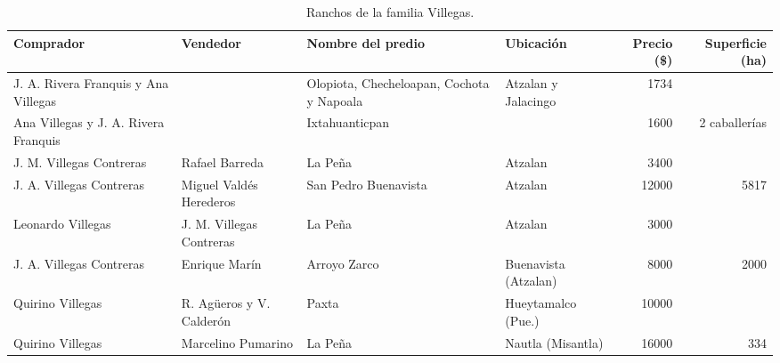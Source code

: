 \documentclass[14pt,twoside,final]{extbook} %
\begin{document}
\begin{sidewaystable}
\scriptsize
\centering
\caption[Ranchos de la familia Villegas]{Ranchos de la familia Villegas.}
\tlfstyle
\begin{tabular}{@{}llllrr@{}}
\toprule
Comprador & Vendedor & Nombre del predio & Ubicación & Precio (\$) & Superficie (ha) \\
\midrule
J. A. Rivera Franquis\index[nombres]{Rivera Franquis, Jose Antonio@Rivera Franquis, José Antonio} y Ana Villegas\index[nombres]{Villegas, Ana} & {} & Olopiota,\index[lugares]{Olopiota} Checheloapan,\index[lugares]{Checheloapan} Cochota\index[lugares]{Cochota} y Napoala\index[lugares]{Napoala} & Atzalan\index[lugares]{Atzalan} y Jalacingo\index[lugares]{Jalacingo} & 1734 & {} \\
Ana Villegas y J. A. Rivera Franquis & {} & Ixtahuanticpan\index[lugares]{Ixtahuanticpan} & {} & 1600 & 2 caballerías \\
J. M. Villegas Contreras\index[nombres]{Villegas del Campo, Jose Maria@Villegas del Campo, José María} & Rafael Barreda\index[nombres]{Barreda, Rafaela} & La Peña\index[lugares]{Pena, La@Peña, La!predio} & Atzalan & 3400 & {} \\
J. A. Villegas Contreras\index[nombres]{Villegas Contreras, Jose Antonio@Villegas Contreras, José Antonio} & Miguel Valdés\index[nombres]{Valdes, Miguel@Valdés, Miguel!herederos} Herederos & San Pedro Buenavista\index[lugares]{San Pedro Buenavista!rancho} & Atzalan & 12000 & 5817 \\
Leonardo Villegas\index[nombres]{Villegas Perdomo, Leonardo} & J. M. Villegas Contreras & La Peña & Atzalan & 3000 & {} \\
J. A. Villegas Contreras & Enrique Marín\index[nombres]{Marin, Enrique@Marín, Enrique} & Arroyo Zarco\index[lugares]{Arroyo Zarco!rancho} & Buenavista\index[lugares]{San Pedro Buenavista} (Atzalan) & 8000 & 2000 \\
Quirino Villegas\index[nombres]{Villegas, Quirino} & R. Agüeros\index[nombres]{Agueros, Ruperto@Agüeros, Ruperto} y V. Calderón\index[nombres]{Calderon, Virginia@Calderón, Virginia} & Paxta\index[lugares]{Paxta} & Hueytamalco\index[lugares]{Hueytamalco} (Pue.)\index[lugares]{Puebla} & 10000 & {} \\
Quirino Villegas & Marcelino Pumarino\index[nombres]{Pumarino, Marcelino} & La Peña\index[lugares]{Pena, La@Peña, La!rancho} & Nautla\index[lugares]{Nautla} (Misantla)\index[lugares]{Misantla} & 16000 & 334 \\

\end{tabular}
\end{sidewaystable}
\end{document}
